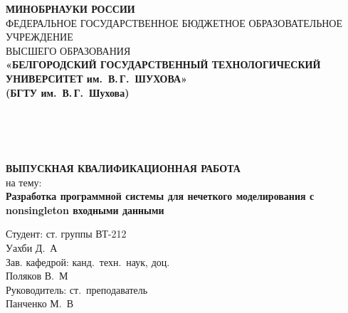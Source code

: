 
\begin{center}
  \textbf{МИНОБРНАУКИ РОССИИ}\\[0.5em]
  \vspace{0.2em}
  {\scriptsize ФЕДЕРАЛЬНОЕ ГОСУДАРСТВЕННОЕ БЮДЖЕТНОЕ ОБРАЗОВАТЕЛЬНОЕ УЧРЕЖДЕНИЕ\\[-0.5em]
  ВЫСШЕГО ОБРАЗОВАНИЯ}\\[0.5em]
  {\small \textbf{«БЕЛГОРОДСКИЙ ГОСУДАРСТВЕННЫЙ ТЕХНОЛОГИЧЕСКИЙ\\
  УНИВЕРСИТЕТ им.\ В.\,Г.\ ШУХОВА»\\[-0.3em]
  (БГТУ им.\ В.\,Г.\ Шухова)}}
\end{center}

\vspace{1em}

\begin{flushleft}
{\footnotesize                           %
  \\
  \\
  \\
}
\end{flushleft}

\vspace{1em}

\begin{center}
  \textbf{ВЫПУСКНАЯ КВАЛИФИКАЦИОННАЯ РАБОТА}\\[0.1em]
  на тему:\\[0.5em]
  \textbf{Разработка программной системы для нечеткого моделирования с non\-singleton входными данными}
\end{center}

\vspace{1em}

\begin{flushright}
\small
\begin{minipage}{7cm}
  Студент: ст. группы ВТ-212 \\ Уахби Д.\ А\\
  Зав. кафедрой: канд.\ техн.\ наук, доц.\ \\ Поляков В.\ М\\
  Руководитель: ст.\ преподаватель \\ Панченко М.\ В
\end{minipage}
\end{flushright}


